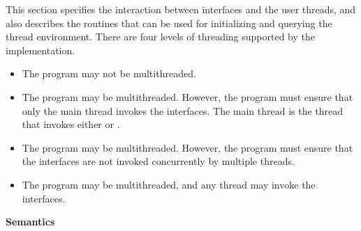 This section specifies the interaction between \openshmem{} interfaces and the
user threads, and also describes the routines that can be used for initializing and 
querying the thread environment. There are four levels of threading supported by
the \openshmem{} implementation.
 
\begin{itemize}
\item {\bf {}} The \openshmem{} program may not be multithreaded. 

\item {\bf {}}
The \openshmem{} program may be multithreaded. However, the 
program must ensure that only the main thread invokes the \openshmem{}
interfaces. The main thread is the thread that invokes either  or
.

\item {\bf {}} 
The \openshmem{} program may be multithreaded. However, the 
program must ensure that the \openshmem{} interfaces 
are not invoked concurrently by multiple threads.

\item {\bf {}}
The \openshmem{} program may be multithreaded, and any 
thread may invoke the \openshmem{} interfaces.
\end{itemize}

\hspace{-15pt}
{\bf Semantics}

